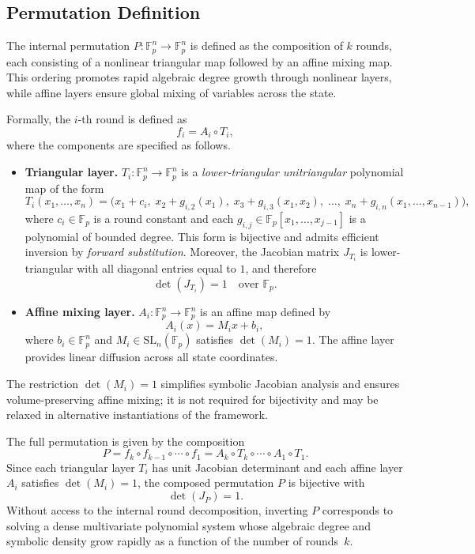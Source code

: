 ﻿\documentclass[english]{aucmcs}
\newcommand{\Fp}{\mathbb{F}_p}
\begin{document}
\subsection{Permutation Definition}
\label{sec:permutation-definition}

The internal permutation $P : \Fp^n \rightarrow \Fp^n$ is defined as the
composition of $k$ rounds, each consisting of a nonlinear triangular map
followed by an affine mixing map. This ordering promotes rapid algebraic
degree growth through nonlinear layers, while affine layers ensure global
mixing of variables across the state.

Formally, the $i$-th round is defined as
\[
f_i = A_i \circ T_i,
\]
where the components are specified as follows.

\begin{itemize}
  \item \textbf{Triangular layer.}
  $T_i : \Fp^n \rightarrow \Fp^n$ is a \emph{lower-triangular unitriangular}
  polynomial map of the form
  \[
  T_i(x_1,\ldots,x_n)=
  \bigl(
    x_1 + c_i,\;
    x_2 + g_{i,2}(x_1),\;
    x_3 + g_{i,3}(x_1,x_2),\;
    \ldots,\;
    x_n + g_{i,n}(x_1,\ldots,x_{n-1})
  \bigr),
  \]
  where $c_i \in \Fp$ is a round constant and each
  $g_{i,j} \in \Fp[x_1,\ldots,x_{j-1}]$ is a polynomial of bounded degree.
  This form is bijective and admits efficient inversion by \emph{forward
  substitution}. Moreover, the Jacobian matrix $J_{T_i}$ is lower-triangular
  with all diagonal entries equal to $1$, and therefore
  \[
  \det(J_{T_i}) = 1 \quad \text{over } \Fp.
  \]

  \item \textbf{Affine mixing layer.}
  $A_i : \Fp^n \rightarrow \Fp^n$ is an affine map defined by
  \[
  A_i(x) = M_i x + b_i,
  \]
  where $b_i \in \Fp^n$ and $M_i \in \mathrm{SL}_n(\Fp)$ satisfies
  $\det(M_i) = 1$. The affine layer provides linear diffusion across all
  state coordinates.
\end{itemize}

The restriction $\det(M_i)=1$ simplifies symbolic Jacobian analysis and
ensures volume-preserving affine mixing; it is not required for bijectivity
and may be relaxed in alternative instantiations of the framework.

The full permutation is given by the composition
\[
P = f_k \circ f_{k-1} \circ \cdots \circ f_1
  = A_k \circ T_k \circ \cdots \circ A_1 \circ T_1.
\]
Since each triangular layer $T_i$ has unit Jacobian determinant and each
affine layer $A_i$ satisfies $\det(M_i)=1$, the composed permutation $P$
is bijective with
\[
\det(J_P) = 1.
\]
Without access to the internal round decomposition, inverting $P$
corresponds to solving a dense multivariate polynomial system whose algebraic
degree and symbolic density grow rapidly as a function of the number of
rounds~$k$.
\end{document}
